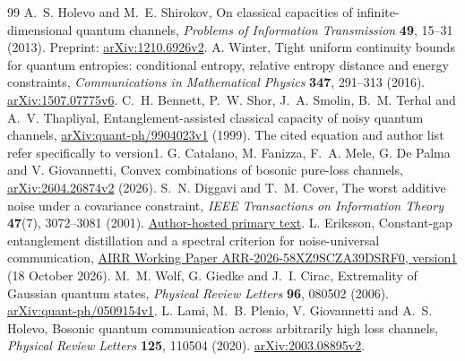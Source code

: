 \documentclass[11pt]{article}
\begin{document}
\begin{thebibliography}{99}
 A.~S. Holevo and M.~E. Shirokov, On classical capacities of infinite-dimensional quantum channels, \emph{Problems of Information Transmission} \textbf{49}, 15--31 (2013). Preprint: \href{https://arxiv.org/abs/1210.6926v2}{arXiv:1210.6926v2}.
 A. Winter, Tight uniform continuity bounds for quantum entropies: conditional entropy, relative entropy distance and energy constraints, \emph{Communications in Mathematical Physics} \textbf{347}, 291--313 (2016). \href{https://arxiv.org/abs/1507.07775v6}{arXiv:1507.07775v6}.
 C.~H. Bennett, P.~W. Shor, J.~A. Smolin, B.~M. Terhal and A.~V. Thapliyal, Entanglement-assisted classical capacity of noisy quantum channels, \href{https://arxiv.org/abs/quant-ph/9904023v1}{arXiv:quant-ph/9904023v1} (1999). The cited equation and author list refer specifically to version1.
 G. Catalano, M. Fanizza, F.~A. Mele, G. De Palma and V. Giovannetti, Convex combinations of bosonic pure-loss channels, \href{https://arxiv.org/abs/2604.26874v2}{arXiv:2604.26874v2} (2026).
 S.~N. Diggavi and T.~M. Cover, The worst additive noise under a covariance constraint, \emph{IEEE Transactions on Information Theory} \textbf{47}(7), 3072--3081 (2001). \href{https://isl.stanford.edu/~cover/papers/diggavi_cover_01.pdf}{Author-hosted primary text}.
 L. Eriksson, Constant-gap entanglement distillation and a spectral criterion for noise-universal communication, \href{https://airr.science/papers/ARR-2026-58XZ9SCZA39DSRF0/versions/v1/}{AIRR Working Paper ARR-2026-58XZ9SCZA39DSRF0, version1} (18 October 2026).
 M.~M. Wolf, G. Giedke and J.~I. Cirac, Extremality of Gaussian quantum states, \emph{Physical Review Letters} \textbf{96}, 080502 (2006). \href{https://arxiv.org/abs/quant-ph/0509154v1}{arXiv:quant-ph/0509154v1}.
 L. Lami, M.~B. Plenio, V. Giovannetti and A.~S. Holevo, Bosonic quantum communication across arbitrarily high loss channels, \emph{Physical Review Letters} \textbf{125}, 110504 (2020). \href{https://arxiv.org/abs/2003.08895v2}{arXiv:2003.08895v2}.
\end{thebibliography}
\end{document}

